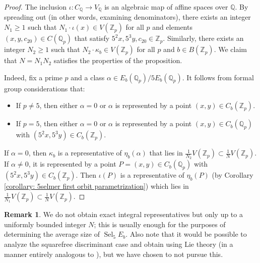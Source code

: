 \documentclass{article} %
\numberwithin{equation}{section}
\theoremstyle{definition}
\newtheorem{remark}[proposition]{Remark}
\newcommand{\Q}{\mathbb{Q}}
\newcommand{\Z}{\mathbb{Z}}
\DeclareMathOperator{\Sel}{Sel}
\begin{document}
\begin{proof}
    The inclusion $\iota\colon C_{\Q} \rightarrow V_{\Q}$ is an algebraic map of affine spaces over $\Q$.
    By spreading out (in other words, examining denominators), there exists an integer $N_1\geq 1$ such that $N_1\cdot \iota(x) \in V(\Z_p)$ for all $p$ and elements $(x,y,c_{20})\in C(\Q_p)$ that satisfy $5^2x,5^3y,c_{20} \in \Z_p$.
    Similarly, there exists an integer $N_2\geq 1$ such that $N_2\cdot \kappa_b \in V(\Z_p)$ for all $p$ and $b\in B(\Z_p)$.
    We claim that $N = N_1N_2$ satisfies the properties of the proposition.

    Indeed, fix a prime $p$ and a class $\alpha\in E_b(\Q_p)/5E_b(\Q_p)$. It follows from formal group considerations that:
    \begin{itemize}
        \item If $p\neq 5$, then either $\alpha=0$ or $\alpha$ is represented by a point $(x,y)\in C_b(\Z_p)$.
        \item If $p=5$, then either $\alpha=0$ or $\alpha$ is represented by a point $(x,y) \in C_b(\Q_p)$ with $(5^2x,5^3y) \in C_b(\Z_p)$.
    \end{itemize}
    If $\alpha=0$, then $\kappa_b$ is a representative of $\eta_b(\alpha)$ that lies in $\frac{1}{N_2} V(\Z_p)\subset \frac{1}{N} V(\Z_p)$.
    If $\alpha\neq 0$, it is represented by a point $P = (x,y) \in C_b(\Q_p)$ with $(5^2x,5^3y)\in C_b(\Z_p)$.
    Then $\iota(P)$ is a representative of $\eta_b(P)$ (by Corollary \ref{corollary: 5selmer first orbit parametrization}) which lies in $\frac{1}{N_1}V(\Z_p)\subset \frac{1}{N}V(\Z_p)$.
\end{proof}

\begin{remark}
    We do not obtain exact integral representatives but only up to a uniformly bounded integer $N$; this is usually enough for the purposes of determining the average size of $\Sel_5 E_b$.
    Also note that it would be possible to analyze the squarefree discriminant case and obtain \cite[Proposition 11]{BS-5Selmer} using Lie theory (in a manner entirely analogous to \cite[Section 7.4]{Laga-ADEpaper}), but we have chosen to not pursue this.
\end{remark}
\end{document}
